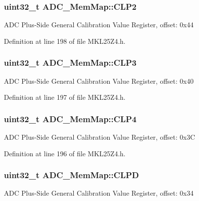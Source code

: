 \subsubsection[{\texorpdfstring{C\+L\+P2}{CLP2}}]{\setlength{\rightskip}{0pt plus 5cm}uint32\+\_\+t A\+D\+C\+\_\+\+Mem\+Map\+::\+C\+L\+P2}\hypertarget{struct_a_d_c___mem_map_aac028a79faac6929bebb1b677b2fbf8b}{}\label{struct_a_d_c___mem_map_aac028a79faac6929bebb1b677b2fbf8b}
A\+DC Plus-\/\+Side General Calibration Value Register, offset\+: 0x44 

Definition at line 198 of file M\+K\+L25\+Z4.\+h.

\subsubsection[{\texorpdfstring{C\+L\+P3}{CLP3}}]{\setlength{\rightskip}{0pt plus 5cm}uint32\+\_\+t A\+D\+C\+\_\+\+Mem\+Map\+::\+C\+L\+P3}\hypertarget{struct_a_d_c___mem_map_a6c77f6b67fa1eccf3549bcf27933f5e7}{}\label{struct_a_d_c___mem_map_a6c77f6b67fa1eccf3549bcf27933f5e7}
A\+DC Plus-\/\+Side General Calibration Value Register, offset\+: 0x40 

Definition at line 197 of file M\+K\+L25\+Z4.\+h.

\subsubsection[{\texorpdfstring{C\+L\+P4}{CLP4}}]{\setlength{\rightskip}{0pt plus 5cm}uint32\+\_\+t A\+D\+C\+\_\+\+Mem\+Map\+::\+C\+L\+P4}\hypertarget{struct_a_d_c___mem_map_ac5abb63ee92fd5bef99367385b258b20}{}\label{struct_a_d_c___mem_map_ac5abb63ee92fd5bef99367385b258b20}
A\+DC Plus-\/\+Side General Calibration Value Register, offset\+: 0x3C 

Definition at line 196 of file M\+K\+L25\+Z4.\+h.

\subsubsection[{\texorpdfstring{C\+L\+PD}{CLPD}}]{\setlength{\rightskip}{0pt plus 5cm}uint32\+\_\+t A\+D\+C\+\_\+\+Mem\+Map\+::\+C\+L\+PD}\hypertarget{struct_a_d_c___mem_map_a33d6e852c48cf68ba5b7db5f96e284f8}{}\label{struct_a_d_c___mem_map_a33d6e852c48cf68ba5b7db5f96e284f8}
A\+DC Plus-\/\+Side General Calibration Value Register, offset\+: 0x34 

